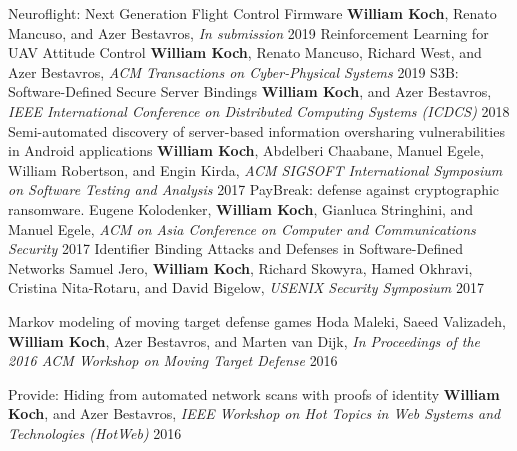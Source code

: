 

\begin{cvhonors}

  \cvhonor
    {Neuroflight: Next Generation Flight Control Firmware} %
    {\textbf{William Koch}, Renato Mancuso, and Azer Bestavros, \textit{In submission}} %
    {} %
    {2019} %
  \cvhonor
    {Reinforcement Learning for UAV Attitude Control} %
    {\textbf{William Koch}, Renato Mancuso, Richard West, and Azer Bestavros, \textit{ACM Transactions on Cyber-Physical Systems}} %
    {} %
    {2019} %
  \cvhonor
    {S3B: Software-Defined Secure Server Bindings} %
    {\textbf{William Koch}, and Azer Bestavros, \textit{IEEE International Conference on Distributed Computing Systems (ICDCS)}} %
    {} %
    {2018} %
  \cvhonor
    {Semi-automated discovery of server-based information oversharing vulnerabilities in Android applications} %
    {\textbf{William Koch}, Abdelberi Chaabane, Manuel Egele, William Robertson, and Engin Kirda, \textit{ACM SIGSOFT International Symposium on Software Testing and Analysis}} %
    {} %
    {2017} %
  \cvhonor
    {PayBreak: defense against cryptographic ransomware.} %
    {Eugene Kolodenker, \textbf{William Koch}, Gianluca Stringhini, and Manuel Egele, \textit{ACM on Asia Conference on Computer and Communications Security}} %
    {} %
    {2017} %
  \cvhonor
    {Identifier Binding Attacks and Defenses in Software-Defined Networks} %
    {Samuel Jero, \textbf{William Koch}, Richard Skowyra, Hamed Okhravi, Cristina Nita-Rotaru, and David Bigelow, \textit{USENIX Security Symposium}} %
    {} %
    {2017} %

  \cvhonor
    {Markov modeling of moving target defense games} %
    {Hoda Maleki,  Saeed Valizadeh, \textbf{William Koch}, Azer Bestavros, and Marten
        van Dijk, \textit{In Proceedings of the 2016 ACM Workshop on Moving Target Defense}} %
    {} %
    {2016} %

  \cvhonor
    {Provide: Hiding from automated network scans with proofs of identity} %
    {\textbf{William Koch}, and Azer Bestavros, \textit{IEEE Workshop on Hot Topics in Web Systems and Technologies (HotWeb)}} %
    {} %
    {2016} %
    
\end{cvhonors}

